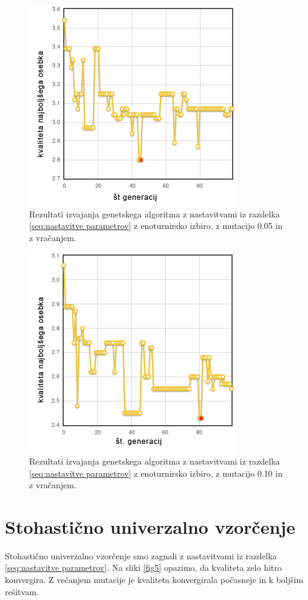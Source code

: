 \documentclass[a4paper, 12pt]{book}
\begin{document}
\begin{figure}
\centering
\includegraphics[scale=0.70]{enotur_vrac_mut1.png}
\caption{Rezultati izvajanja genetskega algoritma z nastavitvami iz razdelka \ref{seq:nastavitve parametrov} z enoturnirsko izbiro, z mutacijo 0.05 in z vra\v canjem.}
\label{fig3}
\end{figure}

\begin{figure}
\centering
\includegraphics[scale=0.70]{enotur_vrac_mut2.png}
\caption{Rezultati izvajanja genetskega algoritma z nastavitvami iz razdelka \ref{seq:nastavitve parametrov} z enoturnirsko izbiro, z mutacijo 0.10 in z vra\v canjem.}
\label{fig4}
\end{figure}

\section{Stohasti\v cno univerzalno vzor\v cenje}
Stohasti\v cno univerzalno vzor\v cenje smo zagnali z nastavitvami iz razdelka \ref{seq:nastavitve parametrov}. Na sliki \ref{fig5} opazimo, da kvaliteta zelo hitro konvergira. Z ve\v canjem mutacije je kvaliteta konvergirala po\v casneje in k bolj\v sim re\v sitvam.
\end{document}
